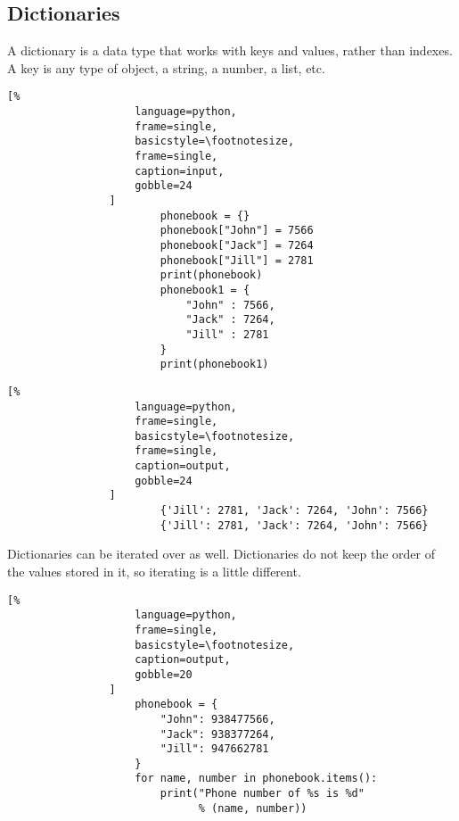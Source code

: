 \documentclass[crop=false,class=book]{standalone}
\begin{document}
        \subsection{Dictionaries}
            A dictionary is a data type that works with keys and
            values, rather than indexes. A key is any type of object,
            a string, a number, a list, etc.\newline
            \begin{minipage}[t]{.48\textwidth}
                \centering
                \begin{lstlisting}[%
                    language=python,
                    frame=single,
                    basicstyle=\footnotesize,
                    frame=single,
                    caption=input,
                    gobble=24
                ]
                        phonebook = {}
                        phonebook["John"] = 7566
                        phonebook["Jack"] = 7264
                        phonebook["Jill"] = 2781
                        print(phonebook)
                        phonebook1 = {
                            "John" : 7566,
                            "Jack" : 7264,
                            "Jill" : 2781
                        }
                        print(phonebook1)
                \end{lstlisting}
            \end{minipage}\hfill
            \begin{minipage}[t]{.48\textwidth}
                \centering
                \begin{lstlisting}[%
                    language=python,
                    frame=single,
                    basicstyle=\footnotesize,
                    frame=single,
                    caption=output,
                    gobble=24
                ]
                        {'Jill': 2781, 'Jack': 7264, 'John': 7566}
                        {'Jill': 2781, 'Jack': 7264, 'John': 7566}
                \end{lstlisting}
            \end{minipage}
            Dictionaries can be iterated over as well. Dictionaries
            do not keep the order of the values stored in it, so
            iterating is a little different.
            \newpage
            \begin{minipage}[t]{.48\textwidth}
                \centering
                \begin{lstlisting}[%
                    language=python,
                    frame=single,
                    basicstyle=\footnotesize,
                    caption=output,
                    gobble=20
                ]
                    phonebook = {
                        "John": 938477566,
                        "Jack": 938377264,
                        "Jill": 947662781
                    }
                    for name, number in phonebook.items():
                        print("Phone number of %s is %d"
                              % (name, number))
                \end{lstlisting}
            \end{minipage}\hfill
\end{document}
